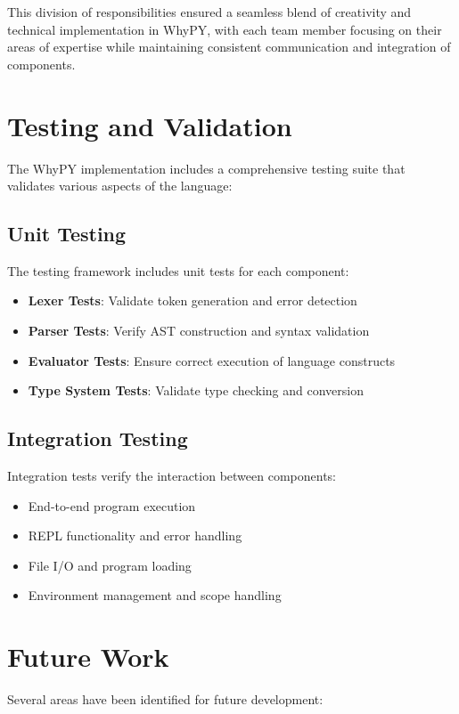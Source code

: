 \documentclass[conference]{IEEEtran}
\begin{document}
This division of responsibilities ensured a seamless blend of creativity and technical implementation in WhyPY, with each team member focusing on their areas of expertise while maintaining consistent communication and integration of components.

\section{Testing and Validation}

The WhyPY implementation includes a comprehensive testing suite that validates various aspects of the language:

\subsection{Unit Testing}
The testing framework includes unit tests for each component:
\begin{itemize}
    \item \textbf{Lexer Tests}: Validate token generation and error detection
    \item \textbf{Parser Tests}: Verify AST construction and syntax validation
    \item \textbf{Evaluator Tests}: Ensure correct execution of language constructs
    \item \textbf{Type System Tests}: Validate type checking and conversion
\end{itemize}

\subsection{Integration Testing}
Integration tests verify the interaction between components:
\begin{itemize}
    \item End-to-end program execution
    \item REPL functionality and error handling
    \item File I/O and program loading
    \item Environment management and scope handling
\end{itemize}

\section{Future Work}

Several areas have been identified for future development:
\end{document}
